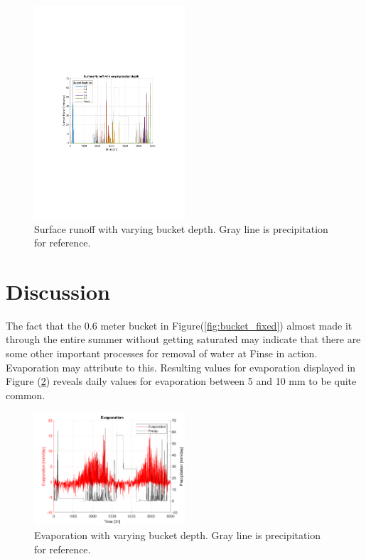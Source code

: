 \documentclass[a4paper,11pt,twocolumn]{article}
\begin{document}
\begin{figure}[h]
	\centering 
	\includegraphics[width=0.5\textwidth]{figures/runoff}
	\caption{Surface runoff with varying bucket depth. Gray line is precipitation for reference.}
	\label{fig:runoff}
\end{figure} 

\section{Discussion}
The fact that the 0.6 meter bucket in  Figure(\ref{fig:bucket_fixed}) almost made it through the entire summer without getting saturated may indicate that there are some other important processes for removal of water at Finse in action. Evaporation may attribute to this. Resulting values for evaporation displayed in Figure (\ref{fig:evaporation}) reveals daily values for evaporation between 5 and 10 mm to be quite common.    
\begin{figure}[h]
	\centering 
	\includegraphics[width=0.5\textwidth]{figures/evaporation}
	\caption{Evaporation with varying bucket depth. Gray line is precipitation for reference.}
	\label{fig:evaporation}
\end{figure} 
\\
\end{document}
